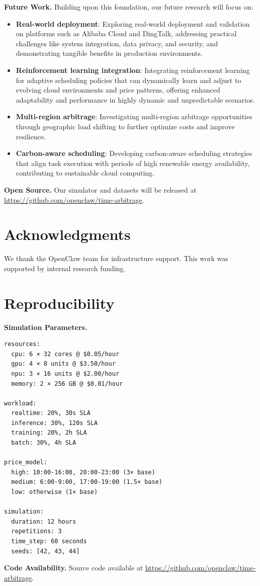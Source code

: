 \documentclass[10pt,conference]{IEEEtran}
\begin{document}
\textbf{Future Work.} Building upon this foundation, our future research will focus on:
\begin{itemize}
    \item \textbf{Real-world deployment}: Exploring real-world deployment and validation on platforms such as Alibaba Cloud and DingTalk, addressing practical challenges like system integration, data privacy, and security, and demonstrating tangible benefits in production environments.
    \item \textbf{Reinforcement learning integration}: Integrating reinforcement learning for adaptive scheduling policies that can dynamically learn and adjust to evolving cloud environments and price patterns, offering enhanced adaptability and performance in highly dynamic and unpredictable scenarios.
    \item \textbf{Multi-region arbitrage}: Investigating multi-region arbitrage opportunities through geographic load shifting to further optimize costs and improve resilience.
    \item \textbf{Carbon-aware scheduling}: Developing carbon-aware scheduling strategies that align task execution with periods of high renewable energy availability, contributing to sustainable cloud computing.
\end{itemize}

\textbf{Open Source.} Our simulator and datasets will be released at \url{https://github.com/openclaw/time-arbitrage}.

\section*{Acknowledgments}

We thank the OpenClaw team for infrastructure support. This work was supported by internal research funding.




\appendix
\section{Reproducibility}

\textbf{Simulation Parameters.}
\begin{verbatim}
resources:
  cpu: 6 × 32 cores @ $0.05/hour
  gpu: 4 × 8 units @ $3.50/hour
  npu: 3 × 16 units @ $2.00/hour
  memory: 2 × 256 GB @ $0.01/hour

workload:
  realtime: 20%, 30s SLA
  inference: 30%, 120s SLA
  training: 20%, 2h SLA
  batch: 30%, 4h SLA

price_model:
  high: 10:00-16:00, 20:00-23:00 (3× base)
  medium: 6:00-9:00, 17:00-19:00 (1.5× base)
  low: otherwise (1× base)

simulation:
  duration: 12 hours
  repetitions: 3
  time_step: 60 seconds
  seeds: [42, 43, 44]
\end{verbatim}

\textbf{Code Availability.} Source code available at \url{https://github.com/openclaw/time-arbitrage}.
\end{document}
